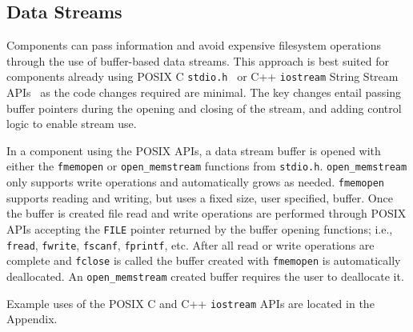 \subsection{Data Streams} \label{sec:imp_DataStreams}
Components can pass information and avoid expensive filesystem operations
through the use of buffer-based data streams.
This approach is best suited for components already using
POSIX C \texttt{stdio.h}~\cite{posixstandard}
or C++ \texttt{iostream} String Stream APIs~\cite{langer2000standard}
as the code changes required are minimal.
The key changes entail passing buffer pointers during the opening and closing of
the stream, and adding control logic to enable stream use.

In a component using the POSIX APIs, a data stream buffer is opened with either
the \texttt{fmemopen} or \texttt{open\_memstream} functions from \texttt{stdio.h}.
\texttt{open\_memstream} only supports write operations and automatically
grows as needed.
\texttt{fmemopen} supports reading and writing, but uses a fixed size, user
specified, buffer.
Once the buffer is created file read and write operations are performed through
POSIX APIs accepting the \texttt{FILE} pointer returned by the buffer opening
functions; i.e., \texttt{fread}, \texttt{fwrite}, \texttt{fscanf},
\texttt{fprintf}, etc.
After all read or write operations are complete and \texttt{fclose} is called
the buffer created with \texttt{fmemopen} is automatically deallocated.
An \texttt{open\_memstream} created buffer requires the user to deallocate it.

Example uses of the POSIX C and C++ \texttt{iostream} APIs are located in the
Appendix.
